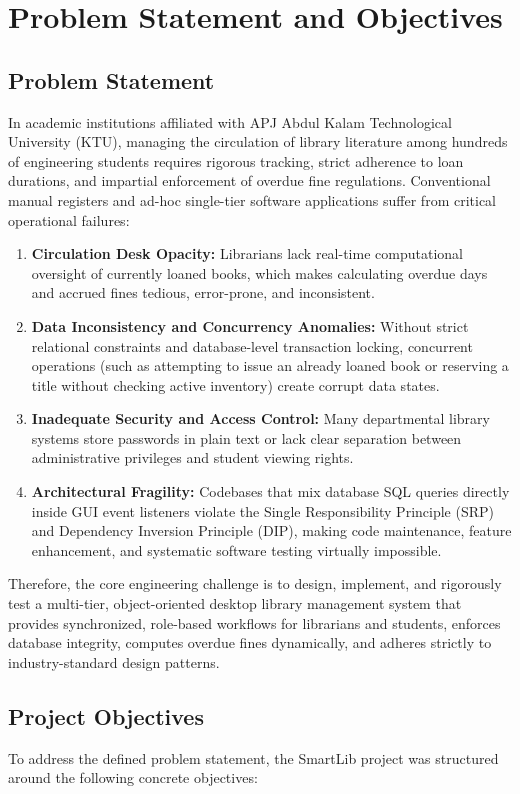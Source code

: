 \chapter{Problem Statement and Objectives}

\section{Problem Statement}
In academic institutions affiliated with APJ Abdul Kalam Technological University (KTU), managing the circulation of library literature among hundreds of engineering students requires rigorous tracking, strict adherence to loan durations, and impartial enforcement of overdue fine regulations. Conventional manual registers and ad-hoc single-tier software applications suffer from critical operational failures:
\begin{enumerate}
    \item \textbf{Circulation Desk Opacity:} Librarians lack real-time computational oversight of currently loaned books, which makes calculating overdue days and accrued fines tedious, error-prone, and inconsistent.
    \item \textbf{Data Inconsistency and Concurrency Anomalies:} Without strict relational constraints and database-level transaction locking, concurrent operations (such as attempting to issue an already loaned book or reserving a title without checking active inventory) create corrupt data states.
    \item \textbf{Inadequate Security and Access Control:} Many departmental library systems store passwords in plain text or lack clear separation between administrative privileges and student viewing rights.
    \item \textbf{Architectural Fragility:} Codebases that mix database SQL queries directly inside GUI event listeners violate the Single Responsibility Principle (SRP) and Dependency Inversion Principle (DIP), making code maintenance, feature enhancement, and systematic software testing virtually impossible.
\end{enumerate}

Therefore, the core engineering challenge is to design, implement, and rigorously test a multi-tier, object-oriented desktop library management system that provides synchronized, role-based workflows for librarians and students, enforces database integrity, computes overdue fines dynamically, and adheres strictly to industry-standard design patterns.

\section{Project Objectives}
To address the defined problem statement, the SmartLib project was structured around the following concrete objectives:

